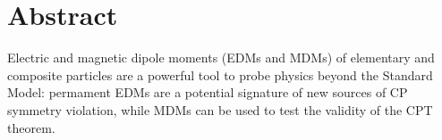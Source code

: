 \documentclass[12pt,a4paper]{book}
\renewcommand{\chaptermark}[1]{\markboth{#1}{}}
\begin{document}





\mainmatter

\chapter*{Abstract}

Electric and magnetic dipole moments (EDMs and MDMs) of elementary and composite particles are a powerful tool to probe physics beyond the Standard Model:
permament EDMs are a potential signature of new sources of CP symmetry violation, while MDMs can be used to test the validity of the CPT theorem.



\end{document}
